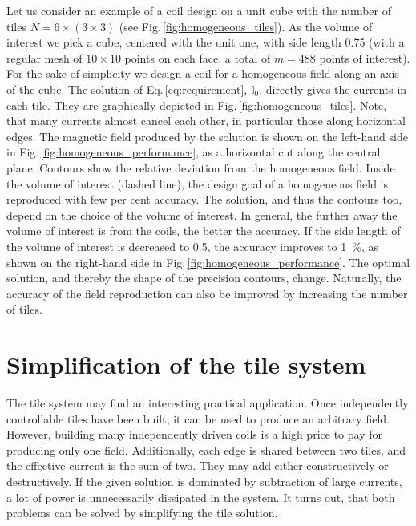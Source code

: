 Let us consider an example of a coil design on a unit cube with the number of tiles $N = 6 \times (3 \times 3)$ (see Fig.\,\ref{fig:homogeneous_tiles}). As the volume of interest we pick a cube, centered with the unit one, with side length \num{0.75} (with a regular mesh of $10 \times 10$ points on each face, a total of $m = 488$ points of interest). For the sake of simplicity we design a coil for a homogeneous field along an axis of the cube. The solution of Eq.\,\ref{eq:requirement}, $\mathbb{I}_0$, directly gives the currents in each tile. They are graphically depicted in Fig.\,\ref{fig:homogeneous_tiles}. Note, that many currents almost cancel each other, in particular those along horizontal edges. The magnetic field produced by the solution is shown on the left-hand side in Fig.\,\ref{fig:homogeneous_performance}, as a horizontal cut along the central plane. Contours show the relative deviation from the homogeneous field. Inside the volume of interest (dashed line), the design goal of a homogeneous field is reproduced with few per cent accuracy. The solution, and thus the contours too, depend on the choice of the volume of interest. In general, the further away the volume of interest is from the coils, the better the accuracy. If the side length of the volume of interest is decreased to \num{0.5}, the accuracy improves to \SI{1}{\percent}, as shown on the right-hand side in Fig.\,\ref{fig:homogeneous_performance}. The optimal solution, and thereby the shape of the precision contours, change. Naturally, the accuracy of the field reproduction can also be improved by increasing the number of tiles.




\section{Simplification of the tile system}
The tile system may find an interesting practical application. Once independently controllable tiles have been built, it can be used to produce an arbitrary field. However, building many independently driven coils is a high price to pay for producing only one field. Additionally, each edge is shared between two tiles, and the effective current is the sum of two. They may add either constructively or destructively. If the given solution is dominated by subtraction of large currents, a lot of power is unnecessarily dissipated in the system. It turns out, that both problems can be solved by simplifying the tile solution.

